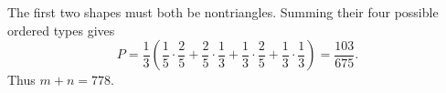 The first two shapes must both be nontriangles. Summing their four possible ordered types gives
\[
P=\dfrac{1}{3}\left(\dfrac{1}{5}\cdot\dfrac{2}{5}+
\dfrac{2}{5}\cdot\dfrac{1}{3}+
\dfrac{1}{3}\cdot\dfrac{2}{5}+
\dfrac{1}{3}\cdot\dfrac{1}{3}\right)=\dfrac{103}{675}.
\]
Thus $\boxed{m+n=778}$.
